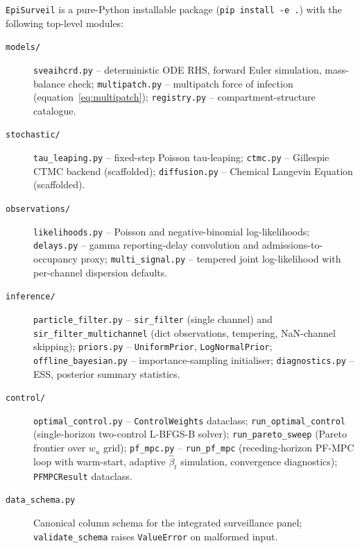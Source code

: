 \documentclass[11pt]{article}
\begin{document}
\texttt{EpiSurveil} is a pure-Python installable package
(\texttt{pip install -e .}) with the following top-level modules:

\begin{description}
  \item[\texttt{models/}]
    \texttt{sveaihcrd.py} -- deterministic ODE RHS, forward Euler
    simulation, mass-balance check;
    \texttt{multipatch.py} -- multipatch force of infection
    (equation~\eqref{eq:multipatch});
    \texttt{registry.py} -- compartment-structure catalogue.

  \item[\texttt{stochastic/}]
    \texttt{tau\_leaping.py} -- fixed-step Poisson tau-leaping;
    \texttt{ctmc.py} -- Gillespie CTMC backend (scaffolded);
    \texttt{diffusion.py} -- Chemical Langevin Equation (scaffolded).

  \item[\texttt{observations/}]
    \texttt{likelihoods.py} -- Poisson and negative-binomial
    log-likelihoods;
    \texttt{delays.py} -- gamma reporting-delay convolution and
    admissions-to-occupancy proxy;
    \texttt{multi\_signal.py} -- tempered joint log-likelihood with
    per-channel dispersion defaults.

  \item[\texttt{inference/}]
    \texttt{particle\_filter.py} -- \texttt{sir\_filter} (single channel)
    and \texttt{sir\_filter\_multichannel} (dict observations, tempering,
    NaN-channel skipping);
    \texttt{priors.py} -- \texttt{UniformPrior}, \texttt{LogNormalPrior};
    \texttt{offline\_bayesian.py} -- importance-sampling initialiser;
    \texttt{diagnostics.py} -- ESS, posterior summary statistics.

  \item[\texttt{control/}]
    \texttt{optimal\_control.py} -- \texttt{ControlWeights} dataclass;
    \texttt{run\_optimal\_control} (single-horizon two-control L-BFGS-B
    solver); \texttt{run\_pareto\_sweep} (Pareto frontier over $w_u$
    grid);
    \texttt{pf\_mpc.py} -- \texttt{run\_pf\_mpc} (receding-horizon PF-MPC
    loop with warm-start, adaptive $\hat\beta_t$ simulation,
    convergence diagnostics); \texttt{PFMPCResult} dataclass.

  \item[\texttt{data\_schema.py}]
    Canonical column schema for the integrated surveillance panel;
    \texttt{validate\_schema} raises \texttt{ValueError} on malformed
    input.
\end{description}
\end{document}
